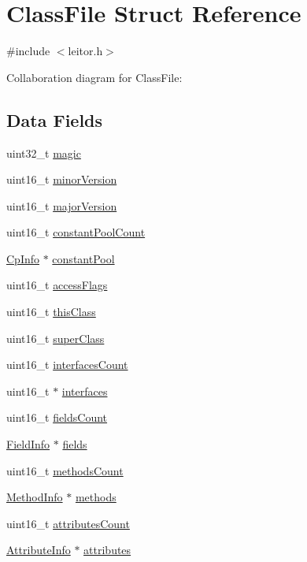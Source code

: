\hypertarget{structClassFile}{}\section{Class\+File Struct Reference}
\label{structClassFile}


{\ttfamily \#include $<$leitor.\+h$>$}



Collaboration diagram for Class\+File\+:
\subsection*{Data Fields}
\begin{DoxyCompactItemize}
\item 
uint32\+\_\+t \hyperlink{structClassFile_a9d4d72751ff9250dd3305d5d853f7921}{magic}
\item 
uint16\+\_\+t \hyperlink{structClassFile_afb41e706bd0e19ed5a24cd0e99ecc4c1}{minor\+Version}
\item 
uint16\+\_\+t \hyperlink{structClassFile_a3424e098e9ef6dbfbdbb9c708afaffe7}{major\+Version}
\item 
uint16\+\_\+t \hyperlink{structClassFile_af185527e4689b1672655f608df4a3c62}{constant\+Pool\+Count}
\item 
\hyperlink{structCpInfo}{Cp\+Info} $\ast$ \hyperlink{structClassFile_a209de5f28c80fb453b37a3f0b320ab9c}{constant\+Pool}
\item 
uint16\+\_\+t \hyperlink{structClassFile_afbb2cd57bb6eb5baa34e83127e928c18}{access\+Flags}
\item 
uint16\+\_\+t \hyperlink{structClassFile_abc02e661935c638b2f231cef576859f1}{this\+Class}
\item 
uint16\+\_\+t \hyperlink{structClassFile_a306c9da73620fa5ad94bbaa64a19afdd}{super\+Class}
\item 
uint16\+\_\+t \hyperlink{structClassFile_adcd02751a38d5b17559fd3c5201b2c42}{interfaces\+Count}
\item 
uint16\+\_\+t $\ast$ \hyperlink{structClassFile_a86680de028c6df386edafa8e8436b92c}{interfaces}
\item 
uint16\+\_\+t \hyperlink{structClassFile_a87f4d2ede2eb9df54d69952df84226ca}{fields\+Count}
\item 
\hyperlink{structFieldInfo}{Field\+Info} $\ast$ \hyperlink{structClassFile_add171dc12613ad29ef94f4f18a50f06a}{fields}
\item 
uint16\+\_\+t \hyperlink{structClassFile_a24d224be2ab473bac3506890c6ff6a4d}{methods\+Count}
\item 
\hyperlink{structMethodInfo}{Method\+Info} $\ast$ \hyperlink{structClassFile_a67e02d50e6807bb97d7d8f265deef9a0}{methods}
\item 
uint16\+\_\+t \hyperlink{structClassFile_ad88c9b8262fbd79d49ad2c163ad45716}{attributes\+Count}
\item 
\hyperlink{structAttributeInfo}{Attribute\+Info} $\ast$ \hyperlink{structClassFile_ad7db56de00dc682671cb8cfb837d92b7}{attributes}
\end{DoxyCompactItemize}


